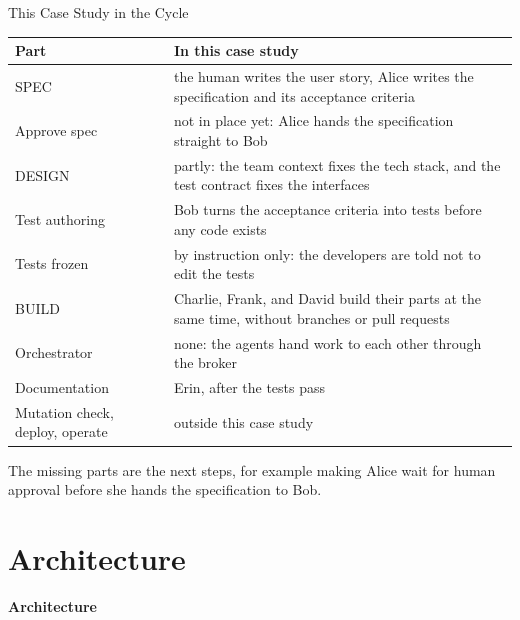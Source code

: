 \documentclass[aspectratio=169, table, 12pt]{beamer}
\begin{document}
\begin{frame}{{\Large This Case Study in the Cycle}}
  \vspace{0pt}
  \centering
  {\scriptsize
  \begin{tabularx}{\textwidth}{lY}
    \hline
    \textbf{Part} & \textbf{In this case study} \\
    \hline
    SPEC & the human writes the user story, Alice writes the specification and its acceptance criteria \\
    \hline
    Approve spec & not in place yet: Alice hands the specification straight to Bob \\
    \hline
    DESIGN & partly: the team context fixes the tech stack, and the test contract fixes the interfaces \\
    \hline
    Test authoring & Bob turns the acceptance criteria into tests before any code exists \\
    \hline
    Tests frozen & by instruction only: the developers are told not to edit the tests \\
    \hline
    BUILD & Charlie, Frank, and David build their parts at the same time, without branches or pull requests \\
    \hline
    Orchestrator & none: the agents hand work to each other through the broker \\
    \hline
    Documentation & Erin, after the tests pass \\
    \hline
    Mutation check, deploy, operate & outside this case study \\
    \hline
  \end{tabularx}}

  \vspace{4pt}
  {\footnotesize The missing parts are the next steps, for example making
  Alice wait for human approval before she hands the specification to Bob.}
\end{frame}

\section{Architecture}

\begin{frame}{\hfill}
  \centering
  \Huge{\textbf{Architecture}}
\end{frame}
\end{document}
